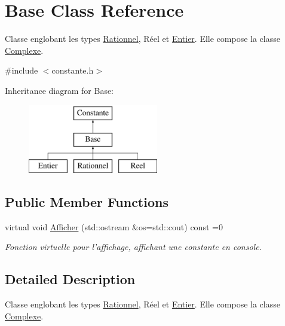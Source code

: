 \hypertarget{class_base}{\section{Base Class Reference}
\label{class_base}
}


Classe englobant les types \hyperlink{class_rationnel}{Rationnel}, Réel et \hyperlink{class_entier}{Entier}. Elle compose la classe \hyperlink{class_complexe}{Complexe}.  




{\ttfamily \#include $<$constante.\-h$>$}

Inheritance diagram for Base\-:\begin{figure}[H]
\begin{center}
\leavevmode
\includegraphics[height=3.000000cm]{class_base}
\end{center}
\end{figure}
\subsection*{Public Member Functions}
\begin{DoxyCompactItemize}
\item 
virtual void \hyperlink{class_base_abf809e43ca06c05dcbe3592648a72466}{Afficher} (std\-::ostream \&os=std\-::cout) const =0
\begin{DoxyCompactList}\small\item\em Fonction virtuelle pour l'affichage, affichant une constante en console. \end{DoxyCompactList}\end{DoxyCompactItemize}


\subsection{Detailed Description}
Classe englobant les types \hyperlink{class_rationnel}{Rationnel}, Réel et \hyperlink{class_entier}{Entier}. Elle compose la classe \hyperlink{class_complexe}{Complexe}. 

